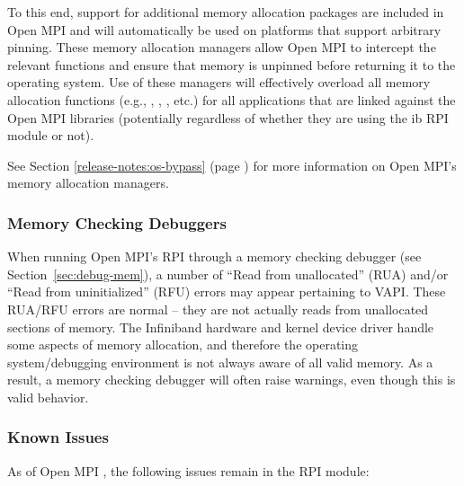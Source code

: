 To this end, support for additional memory allocation packages are
included in Open MPI and will automatically be used on platforms that
support arbitrary pinning.  These memory allocation managers allow
Open MPI to intercept the relevant functions and ensure that memory is
unpinned before returning it to the operating system.  Use of these
managers will effectively overload all memory allocation functions
(e.g., , , , etc.) for all
applications that are linked against the Open MPI libraries
(potentially regardless of whether they are using the ib RPI module or
not).  

See Section \ref{release-notes:os-bypass} (page
\pageref{release-notes:os-bypass}) for more information on Open MPI's
memory allocation managers.


\subsubsection{Memory Checking Debuggers}

When running Open MPI's  RPI through a memory checking debugger
(see Section~\ref{sec:debug-mem}), a number of ``Read from
unallocated'' (RUA) and/or ``Read from uninitialized'' (RFU) errors
may appear pertaining to VAPI.  These RUA/RFU errors are
normal -- they are not actually reads from unallocated sections of
memory.  The Infiniband hardware and kernel device driver handle some
aspects of memory allocation, and therefore the operating
system/debugging environment is not always aware of all valid memory.
As a result, a memory checking debugger will often raise warnings,
even though this is valid behavior.


\subsubsection{Known Issues}

As of Open MPI \lamversion, the following issues remain in the
 RPI module:

